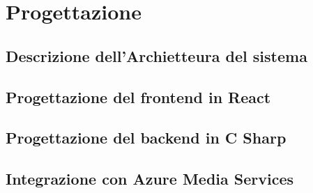 \chapter{Progettazione}
\label{cap:progettazione}

\section{Descrizione dell'Archietteura del sistema}

\section{Progettazione del frontend in React}

\section{Progettazione del backend in C Sharp}

\section{Integrazione con Azure Media Services}